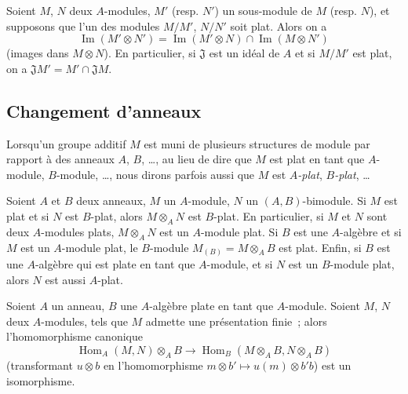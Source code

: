 \begin{env}[6.1.4]
\label{0.6.1.4-fr}
Soient $M$, $N$ deux $A$-modules, $M'$ (resp. $N'$) un sous-module de $M$
(resp. $N$), et supposons que l'un des modules $M/M'$, $N/N'$ soit plat.
Alors on a
\[
  \operatorname{Im}(M'\otimes N')
  =\operatorname{Im}(M'\otimes N)\cap\operatorname{Im}(M\otimes N')
\]
(images dans $M\otimes N$). En particulier, si $\mathfrak{J}$ est un idéal
de $A$ et si $M/M'$ est plat, on a
$\mathfrak{J}M'=M'\cap\mathfrak{J}M$.
\end{env}

\subsection{Changement d'anneaux}
\label{subsection:0.6.2-fr}

Lorsqu'un groupe additif $M$ est muni de plusieurs structures de module par
rapport à des anneaux $A$, $B$, \ldots, au lieu de dire que $M$ est plat en
tant que $A$-module, $B$-module, \ldots, nous dirons parfois aussi que $M$
est \emph{$A$-plat}, \emph{$B$-plat}, \ldots

\begin{env}[6.2.1]
\label{0.6.2.1-fr}
Soient $A$ et $B$ deux anneaux, $M$ un $A$-module, $N$ un
$(A,B)$-bimodule. Si $M$ est plat et si $N$ est $B$-plat, alors
$M\otimes_A N$ est $B$-plat. En particulier, si $M$ et $N$ sont deux
$A$-modules plats, $M\otimes_A N$ est un $A$-module plat. Si $B$ est une
$A$-algèbre et si $M$ est
un $A$-module plat, le $B$-module $M_{(B)}=M\otimes_A B$ est plat. Enfin, si
$B$ est une $A$-algèbre qui est plate en tant que $A$-module, et si $N$ est
un $B$-module plat, alors $N$ est aussi $A$-plat.
\end{env}

\begin{env}[6.2.2]
\label{0.6.2.2-fr}
Soient $A$ un anneau, $B$ une $A$-algèbre plate en tant que $A$-module.
Soient $M$, $N$ deux $A$-modules, tels que $M$ admette une présentation
finie~; alors l'homomorphisme canonique
\[
  \operatorname{Hom}_A(M,N)\otimes_A B
  \longrightarrow
  \operatorname{Hom}_B(M\otimes_A B,N\otimes_A B)
  \tag{6.2.2.1}
\]
(transformant $u\otimes b$ en l'homomorphisme
$m\otimes b'\longmapsto u(m)\otimes b'b$) est un isomorphisme.
\end{env}

